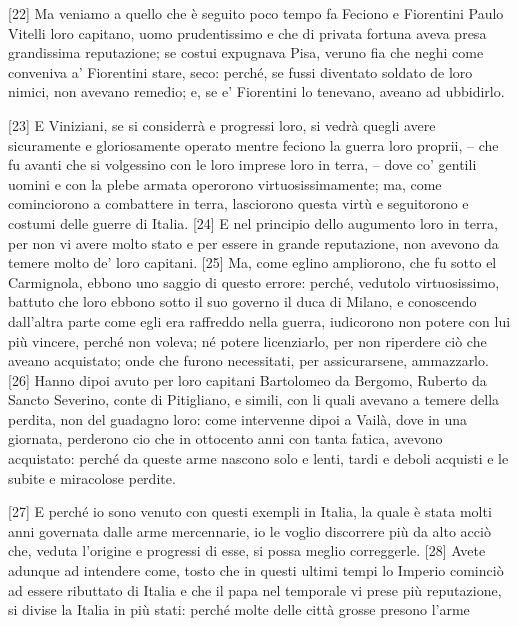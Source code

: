{[}22{]} Ma veniamo a quello che è seguito poco tempo fa Feciono e
Fiorentini Paulo Vitelli loro capitano, uomo prudentissimo e che di
privata fortuna aveva presa grandissima reputazione; se costui expugnava
Pisa, veruno fia che neghi come conveniva a' Fiorentini stare, seco:
perché, se fussi diventato soldato de loro nimici, non avevano remedio;
e, se e' Fiorentini lo tenevano, aveano ad ubbidirlo.

{[}23{]} E Viniziani, se si considerrà e progressi loro, si vedrà quegli
avere sicuramente e gloriosamente operato mentre feciono la guerra loro
proprii, -- che fu avanti che si volgessino con le loro imprese loro in
terra, -- dove co' gentili uomini e con la plebe armata operorono
virtuosissimamente; ma, come cominciorono a combattere in terra,
lasciorono questa virtù e seguitorono e costumi delle guerre di Italia.
{[}24{]} E nel principio dello augumento loro in terra, per non vi avere
molto stato e per essere in grande reputazione, non avevono da temere
molto de' loro capitani. {[}25{]} Ma, come eglino ampliorono, che fu
sotto el Carmignola, ebbono uno saggio di questo errore: perché,
vedutolo virtuosissimo, battuto che loro ebbono sotto il suo governo il
duca di Milano, e conoscendo dall'altra parte come egli era raffreddo
nella guerra, iudicorono non potere con lui più vincere, perché non
voleva; né potere licenziarlo, per non riperdere ciò che aveano
acquistato; onde che furono necessitati, per assicurarsene, ammazzarlo.
{[}26{]} Hanno dipoi avuto per loro capitani Bartolomeo da Bergomo,
Ruberto da Sancto Severino, conte di Pitigliano, e simili, con li quali
avevano a temere della perdita, non del guadagno loro: come intervenne
dipoi a Vailà, dove in una giornata, perderono cio che in ottocento anni
con tanta fatica, avevono acquistato: perché da queste arme nascono solo
e lenti, tardi e deboli acquisti e le subite e miracolose perdite.

{[}27{]} E perché io sono venuto con questi exempli in Italia, la quale
è stata molti anni governata dalle arme mercennarie, io le voglio
discorrere più da alto acciò che, veduta l'origine e progressi di esse,
si possa meglio correggerle. {[}28{]} Avete adunque ad intendere come,
tosto che in questi ultimi tempi lo Imperio cominciò ad essere ributtato
di Italia e che il papa nel temporale vi prese più reputazione, si
divise la Italia in più stati: perché molte delle città grosse presono l'arme \linebreak

\quebra

